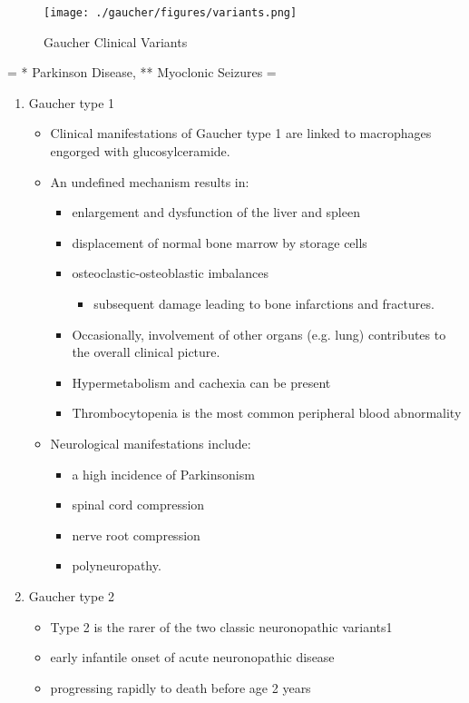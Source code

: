\documentclass{scrartcl}
\begin{document}
\begin{enumerate}
\begin{figure}[htbp]
\centering
\texttt{[image: ./gaucher/figures/variants.png]}
\caption{\label{fig:org3aabaa4}
Gaucher Clinical Variants}
\end{figure}

= * Parkinson Disease, ** Myoclonic Seizures =

\begin{enumerate}
\item Gaucher type 1
\label{sec:orgcd5a2b5}
\begin{itemize}
\item Clinical manifestations of Gaucher type 1 are linked to macrophages
engorged with glucosylceramide.

\item An undefined mechanism results in:
\begin{itemize}
\item enlargement and dysfunction of the liver and spleen
\item displacement of normal bone marrow by storage cells
\item osteoclastic-osteoblastic imbalances
\begin{itemize}
\item subsequent damage leading to bone infarctions and fractures.
\end{itemize}
\item Occasionally, involvement of other organs (e.g. lung) contributes
to the overall clinical picture.
\item Hypermetabolism and cachexia can be present
\item Thrombocytopenia is the most common peripheral blood abnormality
\end{itemize}

\item Neurological manifestations include:
\begin{itemize}
\item a high incidence of Parkinsonism
\item spinal cord compression
\item nerve root compression
\item polyneuropathy.
\end{itemize}
\end{itemize}

\item Gaucher type 2
\label{sec:orgffd8129}
\begin{itemize}
\item Type 2 is the rarer of the two classic neuronopathic variants1
\item early infantile onset of acute neuronopathic disease
\item progressing rapidly to death before age 2 years


\end{itemize}
\end{enumerate}
\end{enumerate}
\end{document}
